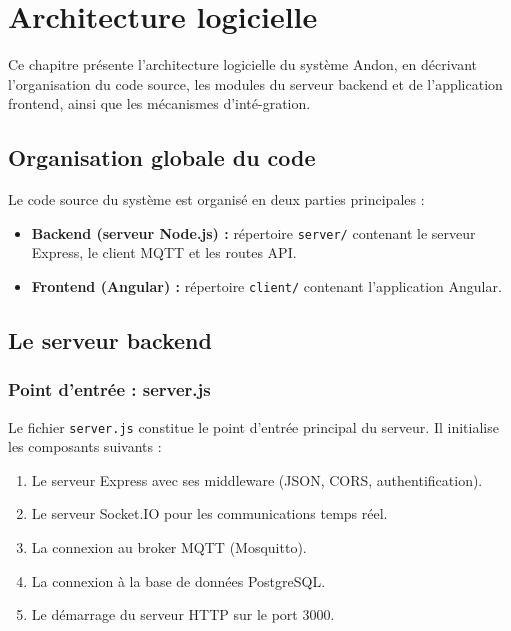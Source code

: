\chapter{Architecture logicielle}

Ce chapitre pr\'esente l'architecture logicielle du syst\`eme Andon, en d\'ecrivant l'organisation du code source, les modules du serveur backend et de l'application frontend, ainsi que les m\'ecanismes d'int\'e-gration.

\section{Organisation globale du code}

Le code source du syst\`eme est organis\'e en deux parties principales :

\begin{itemize}
    \item \textbf{Backend (serveur Node.js) :} r\'epertoire \texttt{server/} contenant le serveur Express, le client MQTT et les routes API.
    \item \textbf{Frontend (Angular) :} r\'epertoire \texttt{client/} contenant l'application Angular.
\end{itemize}


\section{Le serveur backend}

\subsection{Point d'entr\'ee : server.js}

Le fichier \texttt{server.js} constitue le point d'entr\'ee principal du serveur. Il initialise les composants suivants :

\begin{enumerate}
    \item Le serveur Express avec ses middleware (JSON, CORS, authentification).
    \item Le serveur Socket.IO pour les communications temps r\'eel.
    \item La connexion au broker MQTT (Mosquitto).
    \item La connexion \`a la base de donn\'ees PostgreSQL.
    \item Le d\'emarrage du serveur HTTP sur le port 3000.
\end{enumerate}

